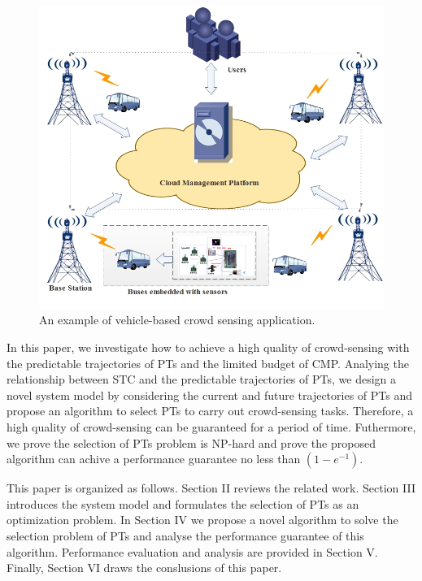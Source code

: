 \documentclass[journal]{IEEEtran}
\begin{document}
\begin{figure}[t]
	\centering
	\includegraphics[width=1.0\linewidth]{Figure1.png}
	\caption[Fig.1]{An example of vehicle-based crowd sensing application.}
	\label{Figure1}
\end{figure}

In this paper, we investigate how to achieve a high quality of crowd-sensing with the predictable trajectories of PTs and the limited budget of CMP. Analying the relationship between STC and the predictable trajectories of PTs, we design a novel system model by considering the current and future trajectories of PTs and propose an algorithm to select PTs to carry out crowd-sensing tasks. Therefore, a high quality of crowd-sensing can be guaranteed for a period of time. Futhermore, we prove the selection of PTs problem is NP-hard and prove the proposed algorithm can achive a performance guarantee  no less than $\left ( 1-e^{-1} \right )$.

This paper is organized as follows. Section II reviews the related work. Section III introduces the system model and formulates the selection of PTs as an optimization problem. In Section IV we propose a novel algorithm to solve the selection problem of PTs and analyse the performance guarantee of this algorithm. Performance evaluation and analysis are provided in Section V. Finally, Section VI draws the conslusions of this paper.
\end{document}
